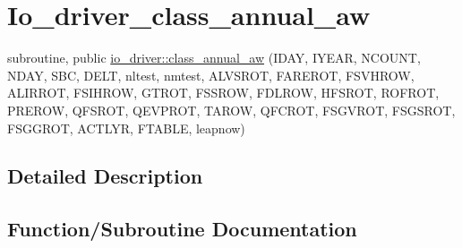 \hypertarget{group__io__driver__class__annual__aw}{}\section{Io\+\_\+driver\+\_\+class\+\_\+annual\+\_\+aw}
\label{group__io__driver__class__annual__aw}
\begin{DoxyCompactItemize}
\item 
subroutine, public \hyperlink{group__io__driver__class__annual__aw_ga0f389a580ed1952081408efc5dee850b}{io\+\_\+driver\+::class\+\_\+annual\+\_\+aw} (I\+D\+A\+Y, I\+Y\+E\+A\+R, N\+C\+O\+U\+N\+T, N\+D\+A\+Y, S\+B\+C, D\+E\+L\+T, nltest, nmtest, A\+L\+V\+S\+R\+O\+T, F\+A\+R\+E\+R\+O\+T, F\+S\+V\+H\+R\+O\+W, A\+L\+I\+R\+R\+O\+T, F\+S\+I\+H\+R\+O\+W, G\+T\+R\+O\+T, F\+S\+S\+R\+O\+W, F\+D\+L\+R\+O\+W, H\+F\+S\+R\+O\+T, R\+O\+F\+R\+O\+T, P\+R\+E\+R\+O\+W, Q\+F\+S\+R\+O\+T, Q\+E\+V\+P\+R\+O\+T, T\+A\+R\+O\+W, Q\+F\+C\+R\+O\+T, F\+S\+G\+V\+R\+O\+T, F\+S\+G\+S\+R\+O\+T, F\+S\+G\+G\+R\+O\+T, A\+C\+T\+L\+Y\+R, F\+T\+A\+B\+L\+E, leapnow)
\end{DoxyCompactItemize}


\subsection{Detailed Description}


\subsection{Function/\+Subroutine Documentation}
\hypertarget{group__io__driver__class__annual__aw_ga0f389a580ed1952081408efc5dee850b}{}
